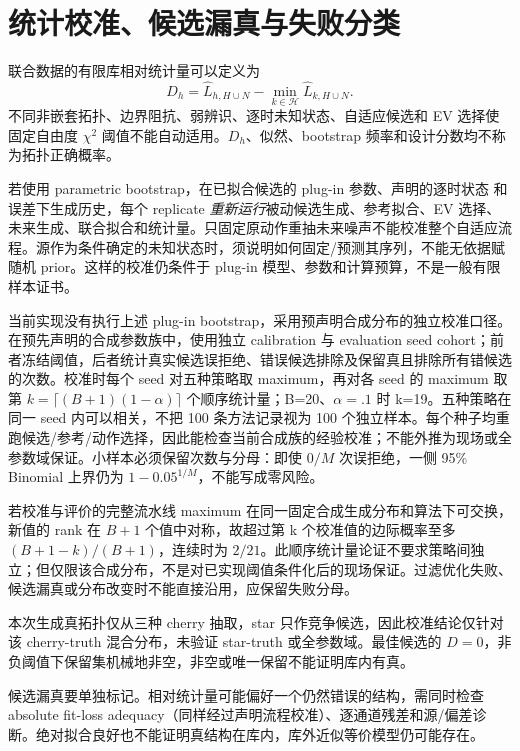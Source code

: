 \documentclass[UTF8,fontset=fandol,11pt,a4paper]{ctexart}
\newcommand{\HH}{\mathcal H}
\begin{document}
\section{统计校准、候选漏真与失败分类}
\label{sec:calibration}
联合数据的有限库相对统计量可以定义为
\begin{equation}
D_h=\widehat L_{h,H\cup N}-\min_{k\in\HH}\widehat L_{k,H\cup N}.
\label{eq:deviance}
\end{equation}
不同非嵌套拓扑、边界阻抗、弱辨识、逐时未知状态、自适应候选和 EV 选择使固定自由度 $\chi^2$ 阈值不能自动适用。$D_h$、似然、bootstrap 频率和设计分数均不称为拓扑正确概率。

若使用 parametric bootstrap，在已拟合候选的 plug-in 参数、声明的逐时状态 和误差下生成历史，每个 replicate \emph{重新运行}被动候选生成、参考拟合、EV 选择、未来生成、联合拟合和统计量。只固定原动作重抽未来噪声不能校准整个自适应流程。源作为条件确定的未知状态时，须说明如何固定/预测其序列，不能无依据赋随机 prior。这样的校准仍条件于 plug-in 模型、参数和计算预算，不是一般有限样本证书。

当前实现没有执行上述 plug-in bootstrap，采用预声明合成分布的独立校准口径。在预先声明的合成参数族中，使用独立 calibration 与 evaluation seed cohort；前者冻结阈值，后者统计真实候选误拒绝、错误候选排除及保留真且排除所有错候选的次数。校准时每个 seed 对五种策略取 maximum，再对各 seed 的 maximum 取第 $k=\lceil(B+1)(1-\alpha)\rceil$ 个顺序统计量；B=20、$\alpha=.1$ 时 k=19。五种策略在同一 seed 内可以相关，不把 100 条方法记录视为 100 个独立样本。每个种子均重跑候选/参考/动作选择，因此能检查当前合成族的经验校准；不能外推为现场或全参数域保证。小样本必须保留次数与分母：即使 $0/M$ 次误拒绝，一侧 95\% Binomial 上界仍为 $1-0.05^{1/M}$，不能写成零风险。

若校准与评价的完整流水线 maximum 在同一固定合成生成分布和算法下可交换，新值的 rank 在 $B+1$ 个值中对称，故超过第 k 个校准值的边际概率至多 $(B+1-k)/(B+1)$，连续时为 $2/21$。此顺序统计量论证不要求策略间独立；但仅限该合成分布，不是对已实现阈值条件化后的现场保证。过滤优化失败、候选漏真或分布改变时不能直接沿用，应保留失败分母。

本次生成真拓扑仅从三种 cherry 抽取，star 只作竞争候选，因此校准结论仅针对该 cherry-truth 混合分布，未验证 star-truth 或全参数域。最佳候选的 $D=0$，非负阈值下保留集机械地非空，非空或唯一保留不能证明库内有真。

候选漏真要单独标记。相对统计量可能偏好一个仍然错误的结构，需同时检查 absolute fit-loss adequacy（同样经过声明流程校准）、逐通道残差和源/偏差诊断。绝对拟合良好也不能证明真结构在库内，库外近似等价模型仍可能存在。
\end{document}
